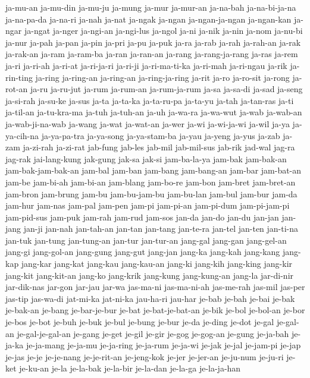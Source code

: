{ja-mu-an ja-mu-din ja-mu-ju ja-mung ja-mur ja-mur-an ja-na-bah
ja-na-bi-ja-na ja-na-pa-da ja-na-ri ja-nah ja-nat ja-ngak ja-ngan
ja-ngan-ja-ngan ja-ngan-kan ja-ngar ja-ngat ja-nger ja-ngi-an ja-ngi-lus
ja-ngol ja-ni ja-nik ja-nin ja-nom ja-nu-bi ja-nur ja-pah ja-pan ja-pin
ja-pri ja-pu ja-puk ja-ra ja-rab ja-rah ja-rah-an ja-rak ja-rak-an ja-ram
ja-ram-ba ja-ran ja-ran-an ja-rang ja-rang-ja-rang ja-ras ja-rem ja-ri
ja-ri-ah ja-ri-at ja-ri-ja-ri ja-ri-ji ja-ri-ma-ti-ka ja-ri-mah ja-ri-ngau
ja-rik ja-rin-ting ja-ring ja-ring-an ja-ring-an ja-ring-ja-ring ja-rit
ja-ro ja-ro-sit ja-rong ja-rot-an ja-ru ja-ru-jut ja-rum ja-rum-an
ja-rum-ja-rum ja-sa ja-sa-di ja-sad ja-seng ja-si-rah ja-su-ke ja-sus
ja-ta ja-ta-ka ja-ta-ru-pa ja-ta-yu ja-tah ja-tan-ras ja-ti ja-til-an
ja-tu-kra-ma ja-tuh ja-tuh-an ja-uh ja-wa-ra ja-wa-wut ja-wab ja-wab-an
ja-wab-ji-na-wab ja-wang ja-wat ja-wat-an ja-wer ja-wi ja-wi-ja-wi ja-wil
ja-ya ja-ya-cih-na ja-ya-pa-tra ja-ya-song ja-ya-stam-ba ja-yau ja-yeng
ja-yus ja-zab ja-zam ja-zi-rah ja-zi-rat jab-fung jab-les jab-mil
jab-mil-sus jab-rik jad-wal jag-ra jag-rak jai-lang-kung jak-gung jak-sa
jak-si jam-ba-la-ya jam-bak jam-bak-an jam-bak-jam-bak-an jam-bal jam-ban
jam-bang jam-bang-an jam-bar jam-bat-an jam-be jam-bi-ah jam-bi-an
jam-blang jam-bo-re jam-bon jam-bret jam-bret-an jam-bron jam-brung jam-bu
jam-bu-jam-bu jam-bu-lan jam-bul jam-bur jam-da jam-hur jam-nas jam-pal
jam-pen jam-pi jam-pi-an jam-pi-dum jam-pi-jam-pi jam-pid-sus jam-puk
jam-rah jam-rud jam-sos jan-da jan-do jan-du jan-jan jan-jang jan-ji
jan-nah jan-tah-an jan-tan jan-tang jan-te-ra jan-tel jan-ten jan-ti-na
jan-tuk jan-tung jan-tung-an jan-tur jan-tur-an jang-gal jang-gan
jang-gel-an jang-gi jang-gol-an jang-gung jang-gut jang-jan jang-ka
jang-kah jang-kang jang-kap jang-kar jang-kat jang-kau jang-kau-an jang-ki
jang-kih jang-king jang-kir jang-kit jang-kit-an jang-ko jang-krik
jang-kung jang-kung-an jang-la jar-di-nir jar-dik-nas jar-gon jar-jau
jar-wa jas-ma-ni jas-ma-ni-ah jas-me-rah jas-mil jas-per jas-tip jas-wa-di
jat-mi-ka jat-ni-ka jau-ha-ri jau-har je-bab je-bah je-bai je-bak
je-bak-an je-bang je-bar-je-bur je-bat je-bat-je-bat-an je-bik je-bol
je-bol-an je-bor je-bos je-bot je-buh je-buk je-bul je-bung je-bur je-da
je-ding je-dot je-gal je-gal-an je-gal-je-gal-an je-gang je-get je-gil
je-gir je-gog je-gog-an je-gung je-ja-bah je-ja-ka je-ja-mang je-ja-mu
je-ja-ring je-ja-rum je-ja-wi je-jak je-jal je-jam-pi je-jap je-jas je-je
je-je-nang je-je-rit-an je-jeng-kok je-jer je-jer-an je-ju-num je-ju-ri
je-ket je-ku-an je-la je-la-bak je-la-bir je-la-dan je-la-ga je-la-ja-han
}

